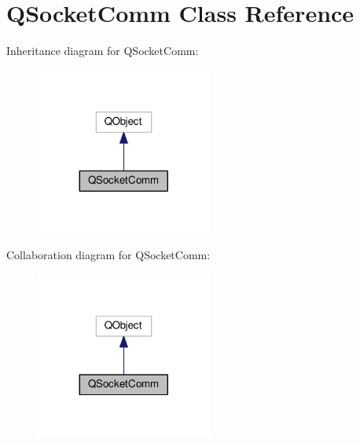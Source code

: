 \hypertarget{class_q_socket_comm}{}\section{Q\+Socket\+Comm Class Reference}
\label{class_q_socket_comm}


Inheritance diagram for Q\+Socket\+Comm\+:\nopagebreak
\begin{figure}[H]
\begin{center}
\leavevmode
\includegraphics[width=164pt]{class_q_socket_comm__inherit__graph}
\end{center}
\end{figure}


Collaboration diagram for Q\+Socket\+Comm\+:\nopagebreak
\begin{figure}[H]
\begin{center}
\leavevmode
\includegraphics[width=164pt]{class_q_socket_comm__coll__graph}
\end{center}
\end{figure}
